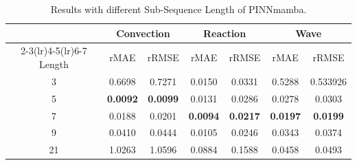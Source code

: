 \documentclass{article}
\theoremstyle{plain}
\theoremstyle{definition}
\theoremstyle{remark}
\begin{document}
\begin{table}[H]
\vspace{-3mm}
  \caption{Results with different Sub-Sequence Length of PINNmamba.}
  
  \centering
    \small
  \begin{tabular}{c|cc|cc|cc}

    \toprule 
      &\multicolumn{2}{c}{Convection }&\multicolumn{2}{c}{Reaction}&\multicolumn{2}{c}{Wave}\\
    \cmidrule(lr){2-3}\cmidrule(lr){4-5}\cmidrule(lr){6-7}
   Length & rMAE & rRMSE & rMAE & rRMSE & rMAE & rRMSE\\
   \midrule
   3 &0.6698 & 0.7271 &0.0150 & 0.0331&  0.5288 & 0.533926 \\
 5 &\textbf{0.0092} & \textbf{0.0099}&0.0131 & 0.0286 & 0.0278&  0.0303 \\
 7 &0.0188 & 0.0201 &\textbf{0.0094} &\textbf{0.0217} & \textbf{0.0197} &  \textbf{0.0199}\\
 9 &0.0410 &0.0444 &0.0105 & 0.0246 &0.0343 & 0.0374 \\
21 &1.0263 & 1.0596 &0.0884 & 0.1588 & 0.0458& 0.0493 \\
    

   

    \bottomrule
  \end{tabular}
  \normalsize
  \label{tab:length}

\end{table}
\end{document}
